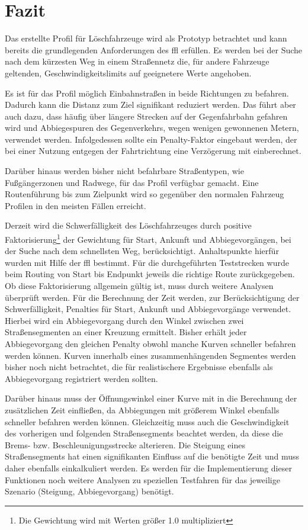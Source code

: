 \section{Fazit}

Das erstellte Profil für Löschfahrzeuge wird als Prototyp betrachtet und kann bereits die grundlegenden Anforderungen des \gls{ffl} erfüllen.
Es werden bei der Suche nach dem kürzesten Weg in einem Straßennetz die, für andere Fahrzeuge geltenden, Geschwindigkeitslimits auf geeignetere Werte angehoben.

Es ist für das Profil möglich Einbahnstraßen in beide Richtungen zu befahren.
Dadurch kann die Distanz zum Ziel signifikant reduziert werden.
Das führt aber auch dazu, dass häufig über längere Strecken auf der Gegenfahrbahn gefahren wird und Abbiegespuren des Gegenverkehrs, wegen wenigen gewonnenen Metern, verwendet werden.
Infolgedessen sollte ein Penalty-Faktor eingebaut werden, der bei einer Nutzung entgegen der Fahrtrichtung eine Verzögerung mit einberechnet.

Darüber hinaus werden bisher nicht befahrbare Straßentypen, wie Fußgängerzonen und Radwege, für das Profil verfügbar gemacht.
Eine Routenführung bis zum Zielpunkt wird so gegenüber den normalen Fahrzeug Profilen in den meisten Fällen erreicht.

Derzeit wird die Schwerfälligkeit des Löschfahrzeuges durch positive Faktorisierung\footnote{Die Gewichtung wird mit Werten größer 1.0 multipliziert} der Gewichtung für Start, Ankunft und Abbiegevorgängen, bei der Suche nach dem schnellsten Weg, berücksichtigt.
Anhaltspunkte hierfür wurden mit Hilfe der \gls{ffl} bestimmt.
Für die durchgeführten Teststrecken wurde beim Routing von Start bis Endpunkt jeweils die richtige Route zurückgegeben.
Ob diese Faktorisierung allgemein gültig ist, muss durch weitere Analysen überprüft werden.
Für die Berechnung der Zeit werden, zur Berücksichtigung der Schwerfälligkeit, Penalties für Start, Ankunft und Abbiegevorgänge verwendet.
Hierbei wird ein Abbiegevorgang durch den Winkel zwischen zwei Straßensegmenten an einer Kreuzung ermittelt.
Bisher erhält jeder Abbiegevorgang den gleichen Penalty obwohl manche Kurven schneller befahren werden können.
Kurven innerhalb eines zusammenhängenden Segmentes werden bisher noch nicht betrachtet, die für realistischere Ergebnisse ebenfalls als Abbiegevorgang registriert werden sollten.

Darüber hinaus muss der Öffnungswinkel einer Kurve mit in die Berechnung der zusätzlichen Zeit einfließen, da Abbiegungen mit größerem Winkel ebenfalls schneller befahren werden können.
Gleichzeitig muss auch die Geschwindigkeit des vorherigen und folgenden Straßensegments beachtet werden, da diese die Brems- bzw. Beschleunigungsstrecke alterieren.
Die Steigung eines Straßensegments hat einen signifikanten Einfluss auf die benötigte Zeit und muss daher ebenfalls einkalkuliert werden.
Es werden für die Implementierung dieser Funktionen noch weitere Analysen zu speziellen Testfahren für das jeweilige Szenario (Steigung, Abbiegevorgang) benötigt.

